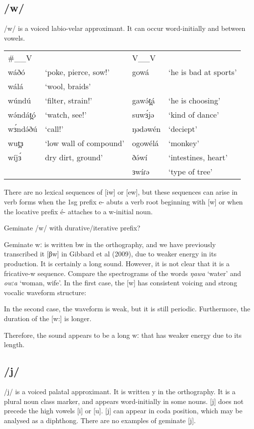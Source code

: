 

\subsection{/w/}
/w/ is a voiced labio-velar approximant. It can occur word-initially and between vowels. 

\ea 	
\begin{tabular}[t]{lp{3cm}lp{3cm}}
\#\_\_V	&&	V\_\_V		\\
wáðó	&‘poke, pierce, sow!’		&gowá	&‘he is bad at sports’\\
wálá	&‘wool, braids’			\\
wúndú	&‘filter, strain!’		&gawə́t̪á	&‘he is choosing’\\
wə́ndát̪ó	&‘watch, see!’		&suwɜ́jə	&‘kind of dance’\\
wɜ́ndə́ðú	&‘call!’		&ŋədəwén	&‘deciept’\\
wut̪ɜ	&‘low wall of compound’		&ogowélá		&‘monkey’\\
wíjɜ́	&dry dirt, ground’		&ðə́wí	&‘intestines, heart’\\
							&&ɜwíɾə	&‘type of tree’\\
\end{tabular}\label{ex:ch2:41}	
\z 

There are no lexical sequences of [iw] or [ew], but these sequences can arise in verb forms when the 1sg prefix e- abuts a verb root beginning with [w] or when the locative prefix é- attaches to a w-initial noun. 

Geminate /w/ with durative/iterative prefix? 

Geminate wː is written bw in the orthography, and we have previously transcribed it [βw] in Gibbard et al (2009), due to weaker energy in its production. It is certainly a long sound. However, it is not clear that it is a fricative-w sequence. Compare the spectrograms of the words \textit{ŋawa} ‘water’ and \textit{owːa} ‘woman, wife’. In the first case, the [w] has consistent voicing and strong vocalic waveform structure:
 

In the second case, the waveform is weak, but it is still periodic. Furthermore, the duration of the [w:] is longer. 


Therefore, the sound appears to be a long wː that has weaker energy due to its length. 

\subsection{/j/}
/j/ is a voiced palatal approximant. It is written y in the orthography. It is a plural noun class marker, and appears word-initially in some nouns. [j] does not precede the high vowels [i] or [u]. [j] can appear in coda position, which may be analysed as a diphthong. There are no examples of geminate [j]. 

